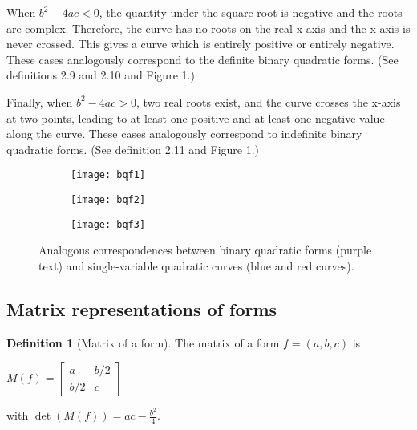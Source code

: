 \documentclass{article}
\theoremstyle{definition}
\newtheorem{definition}{Definition}[section]
\theoremstyle{theorem}
\theoremstyle{example}
\theoremstyle{corollary}
\begin{document}
\bigskip

When \(b^{2} - 4ac < 0\), the quantity under the square root is negative and the roots are complex. Therefore, the curve has no roots on the real x-axis and the x-axis is never crossed. This gives a curve which is entirely positive or entirely negative. These cases analogously correspond to the definite binary quadratic forms. (See definitions 2.9 and 2.10 and Figure 1.)

\bigskip

Finally, when \(b^{2} - 4ac > 0\), two real roots exist, and the curve crosses the x-axis at two points, leading to at least one positive and at least one negative value along the curve. These cases analogously correspond to indefinite binary quadratic forms. (See definition 2.11 and Figure 1.)

\bigskip

\begin{figure}[H]
    \centering
    \begin{subfigure}
        \centering
        \texttt{[image: bqf1]}
    \end{subfigure}
    \begin{subfigure}
        \centering
        \texttt{[image: bqf2]}
    \end{subfigure}
    \begin{subfigure}
        \centering
        \texttt{[image: bqf3]}
    \end{subfigure}    
    \caption{Analogous correspondences between binary quadratic forms (purple text) and single-variable quadratic curves (blue and red curves).}
\end{figure}







\bigskip

\subsection{Matrix representations of forms}

\bigskip

\theoremstyle{definition}
\begin{definition}[Matrix of a form]
The matrix of a form \(f = (a, b, c)\) is
\begin{center}
\(M(f) = \begin{bmatrix} a & b/2 \\ b/2 & c \end{bmatrix}\)
\end{center}
with \(\det(M(f)) = ac - \frac{b^{2}}{4}\).
\end{definition}
\end{document}
